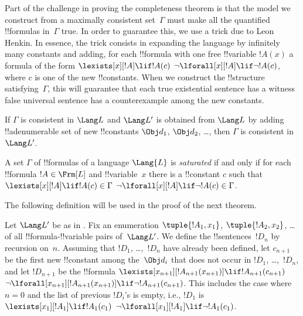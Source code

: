 \documentclass[../../include/open-logic-section]{subfiles}
\begin{document}


\begin{explain}
Part of the challenge in proving the completeness theorem is that the
model we construct from a maximally consistent set~$\Gamma$ must make
all the quantified !!{formula}s in~$\Gamma$ true.  In order to
guarantee this, we use a trick due to Leon Henkin.  In essence, the
trick consists in expanding the language by infinitely many constants
and adding, for each !!{formula} with one free !!{variable} $!A(x)$ a
formula of the form
      {$\lexists[x][!A] \lif !A(c)$}
      {$\lnot\lforall[x][!A] \lif \lnot !A(c)$},
where $c$ is one of the new !!{constant}s.  When we construct the
!!{structure} satisfying~$\Gamma$, this will guarantee that each
{true existential sentence has a witness}
{false universal sentence has a counterexample}
among the new constants.
\end{explain}

\begin{lem}
If $\Gamma$ is consistent in $\Lang L$ and $\Lang L'$ is obtained from
$\Lang L$ by adding !!a{denumerable} set of new !!{constant}s $\Obj d_1$,
$\Obj d_2$, \dots, then $\Gamma$ is consistent in~$\Lang L'$.
\end{lem}

\begin{defn}
A set $\Gamma$ of !!{formula}s of a language $\Lang {L}$ is
\emph{saturated} if and only if for each !!{formula} $!A \in \Frm[L]$
and !!{variable}~$x$ there is a !!{constant} $c$ such that
      {$\lexists[x][!A] \lif !A(c) \in \Gamma$}
      {$\lnot\lforall[x][!A] \lif \lnot !A(c) \in \Gamma$}.
\end{defn}

The following definition will be used in the proof of the next theorem.

\begin{defn}
Let $\Lang L'$ be as in .  Fix an enumeration
$\tuple{!A_1, x_1}$, $\tuple{!A_2, x_2}$, \dots of all
!!{formula}-!!{variable} pairs of~$\Lang L'$.  We define the
!!{sentence}s~$!D_n$ by recursion on~$n$. Assuming that $!D_1$,
\dots,~$!D_n$ have already been defined, let $c_{n+1}$ be the first
new !!{constant} among the~$\Obj d_i$ that does not occur in $!D_1$,
\dots,~$!D_n$, and let $!D_{n+1}$ be the !!{formula} 
     {$\lexists[x_{n+1}][!A_{n+1}(x_{n+1})] \lif !A_{n+1}(c_{n+1})$}
     {$\lnot\lforall[x_{n+1}][!A_{n+1}(x_{n+1})] \lif \lnot
       !A_{n+1}(c_{n+1})$}.  This includes the case where $n = 0$ and
     the list of previous $!D_i$'s is empty, i.e., $!D_1$ is
      {$\lexists[x_1][!A_1] \lif !A_1(c_1)$}
           {$\lnot\lforall[x_1][!A_1] \lif \lnot !A_1(c_1)$}.
\end{defn}
\end{document}
